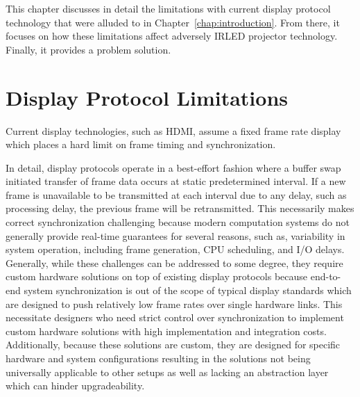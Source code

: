 \label{chap:problem_formulation}

This chapter discusses in detail the limitations with current display protocol technology that were alluded to in Chapter~\ref{chap:introduction}. From there, it focuses on how these limitations affect adversely IRLED projector technology. Finally, it provides a problem solution.

\section{Display Protocol Limitations}


    Current display technologies, such as HDMI, assume a fixed frame rate display which places a hard limit on frame timing and synchronization.

    In detail, display protocols operate in a best-effort fashion where a buffer swap initiated transfer of frame data occurs at static predetermined interval. If a new frame is unavailable to be transmitted at each interval due to any delay, such as processing delay, the previous frame will be retransmitted. This necessarily makes correct synchronization challenging because modern computation systems do not generally provide real-time guarantees for several reasons, such as, variability in system operation, including frame generation, CPU scheduling, and I/O delays. Generally, while these challenges can be addressed to some degree, they require custom hardware solutions on top of existing display protocols because end-to-end system synchronization is out of the scope of typical display standards which are designed to push relatively low frame rates over single hardware links. This necessitate designers who need strict control over synchronization to implement custom hardware solutions with high implementation and integration costs. Additionally, because these solutions are custom, they are designed for specific hardware and system configurations resulting in the solutions not being universally applicable to other setups as well as lacking an abstraction layer which can hinder upgradeability.

